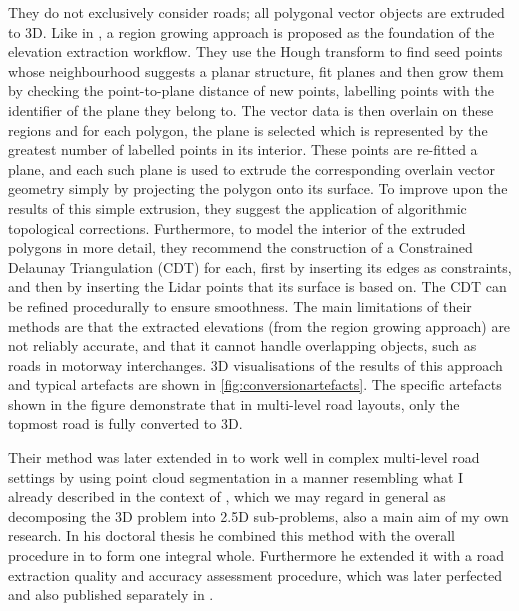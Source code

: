 They do not exclusively consider roads; all polygonal vector objects are extruded to 3D. Like in \cite{hatger_brenner_2003}, a region growing approach is proposed as the foundation of the elevation extraction workflow. They use the Hough transform to find seed points whose neighbourhood suggests a planar structure, fit planes and then grow them by checking the point-to-plane distance of new points, labelling points with the identifier of the plane they belong to. The vector data is then overlain on these regions and for each polygon, the plane is selected which is represented by the greatest number of labelled points in its interior. These points are re-fitted a plane, and each such plane is used to extrude the corresponding overlain vector geometry simply by projecting the polygon onto its surface. To improve upon the results of this simple extrusion, they suggest the application of algorithmic topological corrections. Furthermore, to model the interior of the extruded polygons in more detail, they recommend the construction of a Constrained Delaunay Triangulation (CDT) for each, first by inserting its edges as constraints, and then by inserting the Lidar points that its surface is based on. The CDT can be refined procedurally to ensure smoothness. The main limitations of their methods are that the extracted elevations (from the region growing approach) are not reliably accurate, and that it cannot handle overlapping objects, such as roads in motorway interchanges. 3D visualisations of the results of this approach and typical artefacts are shown in \ref{fig:conversionartefacts}. The specific artefacts shown in the figure demonstrate that in multi-level road layouts, only the topmost road is fully converted to 3D.

Their method was later extended in \cite{oudeElberink_vosselman_2009} to work well in complex multi-level road settings by using point cloud segmentation in a manner resembling what I already described in the context of \cite{boyko_funkhauser_2011}, which we may regard in general as decomposing the 3D problem into 2.5D sub-problems, also a main aim of my own research. In his doctoral thesis \cite{oudeElberink_2010} he combined this method with the overall procedure in \cite{oudeElberink_vosselman_2006} to form one integral whole. Furthermore he extended it with a road extraction quality and accuracy assessment procedure, which was later perfected and also published separately in \cite{oudeElberink_vosselman_2012}.

